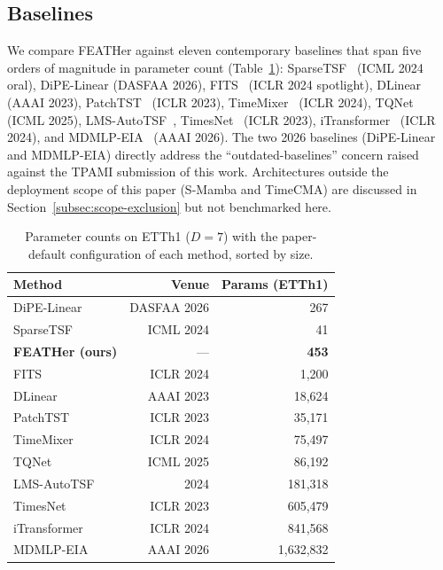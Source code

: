 \documentclass[journal]{IEEEtran}
\theoremstyle{remark}
\begin{document}
\subsection{Baselines}
\label{subsec:baselines}
We compare FEATHer against eleven contemporary baselines that span
five orders of magnitude in parameter count (Table~\ref{tab:params}):
SparseTSF~\cite{Lin2024SparseTSF} (ICML 2024 oral), DiPE-Linear
\cite{Wintertee2026DiPELinear} (DASFAA 2026),
FITS~\cite{Xu2024FITS} (ICLR 2024 spotlight),
DLinear~\cite{Zeng2023DLinear} (AAAI 2023),
PatchTST~\cite{Nie2023PatchTST} (ICLR 2023),
TimeMixer~\cite{Wang2024TimeMixer} (ICLR 2024),
TQNet~\cite{Lin2025TQNet} (ICML 2025),
LMS-AutoTSF~\cite{Ibrahim2024LMSAutoTSF}, TimesNet~\cite{Wu2023TimesNet}
(ICLR 2023), iTransformer~\cite{Liu2024iTransformer} (ICLR 2024), and
MDMLP-EIA~\cite{Zh2026MDMLPEIA} (AAAI 2026). The two 2026 baselines
(DiPE-Linear and MDMLP-EIA) directly address the
``outdated-baselines'' concern raised against the TPAMI submission of
this work. Architectures outside the deployment scope of this paper
(S-Mamba and TimeCMA) are discussed in
Section~\ref{subsec:scope-exclusion} but not benchmarked here.

\begin{table}[t]
\centering
\caption{Parameter counts on ETTh1 ($D{=}7$) with the paper-default
configuration of each method, sorted by size.}
\label{tab:params}
\small
\begin{tabular}{lrr}
\toprule
Method            & Venue         & Params (ETTh1) \\
\midrule
DiPE-Linear       & DASFAA 2026   & 267            \\
SparseTSF         & ICML 2024     & 41             \\
\textbf{FEATHer (ours)} & ---     & \textbf{453}   \\
FITS              & ICLR 2024     & 1{,}200        \\
DLinear           & AAAI 2023     & 18{,}624       \\
PatchTST          & ICLR 2023     & 35{,}171       \\
TimeMixer         & ICLR 2024     & 75{,}497       \\
TQNet             & ICML 2025     & 86{,}192       \\
LMS-AutoTSF       & 2024          & 181{,}318      \\
TimesNet          & ICLR 2023     & 605{,}479      \\
iTransformer      & ICLR 2024     & 841{,}568      \\
MDMLP-EIA         & AAAI 2026     & 1{,}632{,}832  \\
\bottomrule
\end{tabular}
\end{table}
\end{document}
